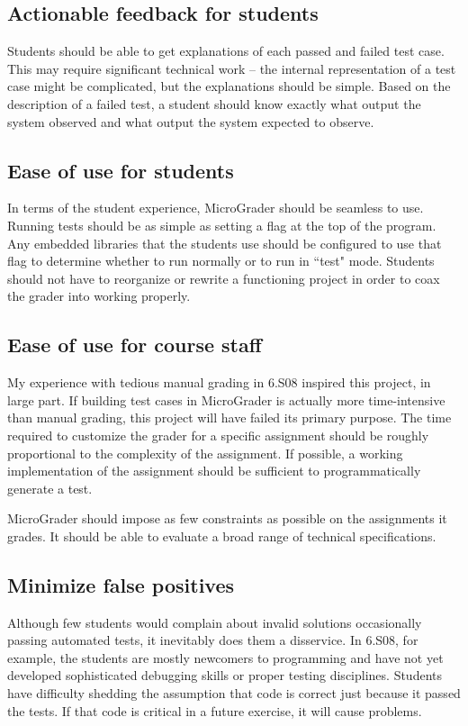 \documentclass[12pt]{article}
\begin{document}
\subsection{Actionable feedback for students}
Students should be able to get explanations of each passed and failed test case.  This may require significant technical work -- the internal representation of a test case might be complicated, but the explanations should be simple.  Based on the description of a failed test, a student should know exactly what output the system observed and what output the system expected to observe.

\subsection{Ease of use for students}
In terms of the student experience, MicroGrader should be seamless to use.  Running tests should be as simple as setting a flag at the top of the program.  Any embedded libraries that the students use should be configured to use that flag to determine whether to run normally or to run in ``test" mode.  Students should not have to reorganize or rewrite a functioning project in order to coax the grader into working properly.

\subsection{Ease of use for course staff}
My experience with tedious manual grading in 6.S08 inspired this project, in large part.  If building test cases in MicroGrader is actually more time-intensive than manual grading, this project will have failed its primary purpose.  The time required to customize the grader for a specific assignment should be roughly proportional to the complexity of the assignment.  If possible, a working implementation of the assignment should be sufficient to programmatically generate a test.

MicroGrader should impose as few constraints as possible on the assignments it grades.  It should be able to evaluate a broad range of technical specifications.

\subsection{Minimize false positives}
Although few students would complain about invalid solutions occasionally passing automated tests, it inevitably does them a disservice.  In 6.S08, for example, the students are mostly newcomers to programming and have not yet developed sophisticated debugging skills or proper testing disciplines.  Students have difficulty shedding the assumption that code is correct just because it passed the tests.  If that code is critical in a future exercise, it will cause problems.
\end{document}
